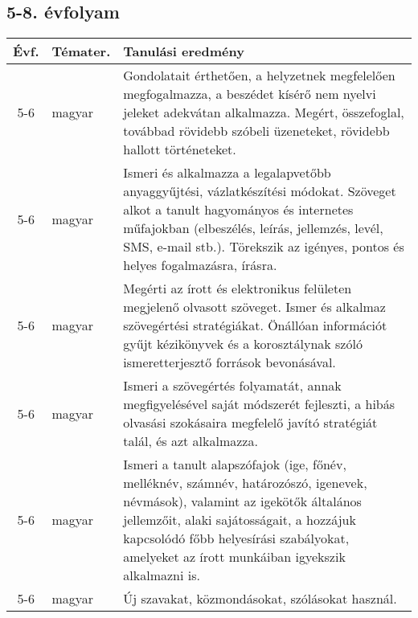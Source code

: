 \subsection{5-8. évfolyam}
\begin{small}
  \begin{longtable}{c | p{2cm} |  p{11cm} }
    \textbf{Évf.} & \textbf{Témater.} & \textbf{Tanulási eredmény} \\ \hline \hline
    \endhead

              5-6 & magyar & Gondolatait érthetően, a helyzetnek megfelelően megfogalmazza, a beszédet kísérő nem nyelvi jeleket adekvátan alkalmazza. Megért, összefoglal, továbbad rövidebb szóbeli üzeneteket, rövidebb hallott történeteket. \\ \hline
              5-6 & magyar & Ismeri és alkalmazza a legalapvetőbb anyaggyűjtési, vázlatkészítési módokat. Szöveget alkot a tanult hagyományos és internetes műfajokban (elbeszélés, leírás, jellemzés, levél, SMS, e-mail stb.). Törekszik az igényes, pontos és helyes fogalmazásra, írásra. \\ \hline
              5-6 & magyar & Megérti az írott és elektronikus felületen megjelenő olvasott szöveget.
Ismer és alkalmaz szövegértési stratégiákat.
Önállóan információt gyűjt kézikönyvek és a korosztálynak szóló ismeretterjesztő források bevonásával. \\ \hline
              5-6 & magyar & Ismeri a szövegértés folyamatát, annak megfigyelésével saját módszerét fejleszti, a hibás olvasási szokásaira megfelelő javító stratégiát talál, és azt alkalmazza. \\ \hline
              5-6 & magyar & Ismeri a tanult alapszófajok (ige, főnév, melléknév, számnév, határozószó, igenevek, névmások), valamint az igekötők általános jellemzőit, alaki sajátosságait, a hozzájuk kapcsolódó főbb helyesírási szabályokat, amelyeket az írott munkáiban igyekszik alkalmazni is. \\ \hline
              5-6 & magyar & Új szavakat, közmondásokat, szólásokat használ. \\ \hline

\end{longtable}
\end{small}
